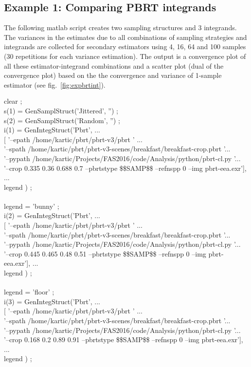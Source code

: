 \subsection{Example 1: Comparing PBRT integrands}\label{sec:expbrtint}
The following matlab script creates two sampling structures and 3 integrands. The variances in the estimates due to all combinations of sampling strategies and integrands are collected for secondary estimators using 4, 16, 64 and 100 samples (30 repetitions for each variance estimation). The output is a convergence plot of all these estimator-integrand combinations and a scatter plot (dual of the convergence plot) based on the the convergence and variance of 1-sample estimator (see fig.~\ref{fig:expbrtint}). 
\begin{tcolorbox}
clear ;\\
s(1) = GenSamplStruct('Jittered', '') ;\\
s(2) = GenSamplStruct('Random', '') ;\\
i(1) = GenIntegStruct('Pbrt', ...\\
            {[ '--epath /home/kartic/pbrt/pbrt-v3/pbrt ' ...\\
            '--spath /home/kartic/pbrt/pbrt-v3-scenes/breakfast/breakfast-crop.pbrt '...\\
            '--pypath /home/kartic/Projects/FAS2016/code/Analysis/python/pbrt-cl.py '...\\
            '--crop 0.335 0.36 0.688 0.7 --pbrtstype \$\$SAMP\$\$ --refnspp 0 --img pbrt-eea.exr']}, ...\\
            legend ) ;\\
\\
legend = 'bunny' ;\\
i(2) = GenIntegStruct('Pbrt', ...\\
            {[ '--epath /home/kartic/pbrt/pbrt-v3/pbrt ' ...\\
            '--spath /home/kartic/pbrt/pbrt-v3-scenes/breakfast/breakfast-crop.pbrt '...\\
            '--pypath /home/kartic/Projects/FAS2016/code/Analysis/python/pbrt-cl.py '...\\
            '--crop 0.445 0.465 0.48 0.51 --pbrtstype \$\$SAMP\$\$ --refnspp 0 --img pbrt-eea.exr']}, ...\\
            legend ) ;\\
\\
legend = 'floor' ;\\
i(3) = GenIntegStruct('Pbrt', ...\\
            {[ '--epath /home/kartic/pbrt/pbrt-v3/pbrt ' ...\\
            '--spath /home/kartic/pbrt/pbrt-v3-scenes/breakfast/breakfast-crop.pbrt '...\\
            '--pypath /home/kartic/Projects/FAS2016/code/Analysis/python/pbrt-cl.py '...\\
            '--crop 0.168 0.2 0.89 0.91 --pbrtstype \$\$SAMP\$\$ --refnspp 0 --img pbrt-eea.exr']}, ...\\
            legend ) ;\\



\end{tcolorbox}
